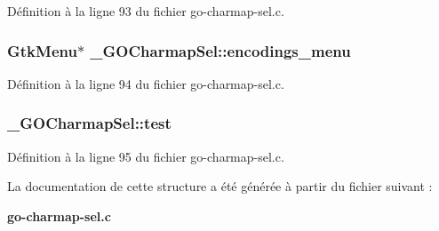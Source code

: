 Définition à la ligne 93 du fichier go-\/charmap-\/sel.c.

\subsubsection[{encodings\_\-menu}]{\setlength{\rightskip}{0pt plus 5cm}GtkMenu$\ast$ {\bf \_\-GOCharmapSel::encodings\_\-menu}}\label{struct__GOCharmapSel_ab31ddccd79af3d634401309b2214d29c}


Définition à la ligne 94 du fichier go-\/charmap-\/sel.c.

\subsubsection[{test}]{ {\bf \_\-GOCharmapSel::test}}\label{struct__GOCharmapSel_a6258edc5b54d1ac2943c448348b2036f}


Définition à la ligne 95 du fichier go-\/charmap-\/sel.c.



La documentation de cette structure a été générée à partir du fichier suivant :\begin{DoxyCompactItemize}
\item 
{\bf go-\/charmap-\/sel.c}\end{DoxyCompactItemize}
